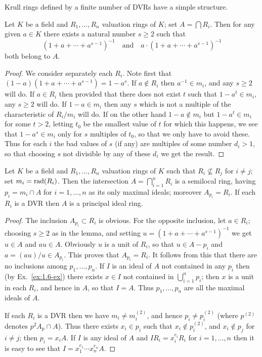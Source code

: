Krull rings defined by a finite number of DVRs have a simple structure.

\begin{lemma}[Nagata]\label{lem:12.1}
Let $K$ be a field and $R_1, \ldots, R_n$ valuation rings of $K$;
set $A = \bigcap R_i$. Then for any given $a \in K$ there exists a natural number $s \ge 2$
such that
\[
  (1 + a + \cdots + a^{s-1})^{-1} \quad \text{and} \quad a \cdot (1 + a + \cdots + a^{s-1})^{-1}
\]
both belong to $A$.
\end{lemma}

\begin{proof}
We consider separately each $R_i$. Note first that $(1 - a)(1 + a + \cdots
+ a^{s-1}) = 1 - a^s$. If $a \notin R_i$ then $a^{-1} \in m_i$, and any $s \ge 2$ will do. If $a \in R_i$ then
provided that there does not exist $t$ such that $1 - a^t \in m_i$, any $s \ge 2$ will do.
If $1 - a \in m_i$ then any $s$ which is not a multiple of the characteristic of $R_i/m_i$
will do. If on the other hand $1 - a \notin m_i$ but $1 - a^t \in m_i$ for some $t > 2$, letting $t_0$
be the smallest value of $t$ for which this happens, we see that $1 - a^s \in m_i$
only for $s$ multiples of $t_0$, so that we only have to avoid these. Thus for each $i$
the bad values of $s$ (if any) are multiples of some number $d_i > 1$, so that
choosing $s$ not divisible by any of these $d_i$ we get the result.
\end{proof}

\begin{theorem}\label{thm:12.2}
Let $K$ be a field and $R_1, \ldots, R_n$ valuation rings of $K$ such
that $R_i \nsubseteq R_j$ for $i \neq j$; set $m_i = \operatorname{rad}(R_i)$. Then the intersection $A = \bigcap_{i=1}^{n} R_i$ is
a semilocal ring, having $p_i = m_i \cap A$ for $i = 1, \ldots, n$ as its only maximal
ideals; moreover $A_{p_i} = R_i$. If each $R_i$ is a DVR then $A$ is a principal ideal
ring.
\end{theorem}

\begin{proof}
The inclusion $A_{p_i} \subset R_i$ is obvious. For the opposite inclusion, let
$a \in R_i$; choosing $s \ge 2$ as in the lemma, and setting $u = (1 + a + \cdots + a^{s-1})^{-1}$
we get $u \in A$ and $au \in A$. Obviously $u$ is a unit of $R_i$, so that $u \in A - p_i$
and $a = (au)/u \in A_{p_i}$. This proves that $A_{p_i} = R_i$. It follows from this
that there are no inclusions among $p_1, \ldots, p_n$. If $I$ is an ideal of $A$ not
contained in any $p_i$ then (by Ex.~\ref{ex:1.6-ex}) there exists $x \in I$ not contained in
$\bigcup_{i=1}^{n} p_i$; then $x$ is a unit in each $R_i$, and hence in $A$, so that $I = A$. Thus
$p_1, \ldots, p_n$ are all the maximal ideals of $A$.

If each $R_i$ is a DVR then we have $m_i \neq m_i^{(2)}$, and hence $p_i \neq p_i^{(2)}$ (where $p^{(2)}$
denotes $p^2A_p \cap A$). Thus there exists $x_i \in p_i$ such that $x_i \notin p_i^{(2)}$, and $x_i \notin p_j$ for
$i \neq j$; then $p_i = x_iA$. If $I$ is any ideal of $A$ and $IR_i = x_i^{e_i}R_i$ for $i = 1, \ldots, n$ then it
is easy to see that $I = x_1^{e_1} \cdots x_n^{e_n}A$.
\end{proof}

